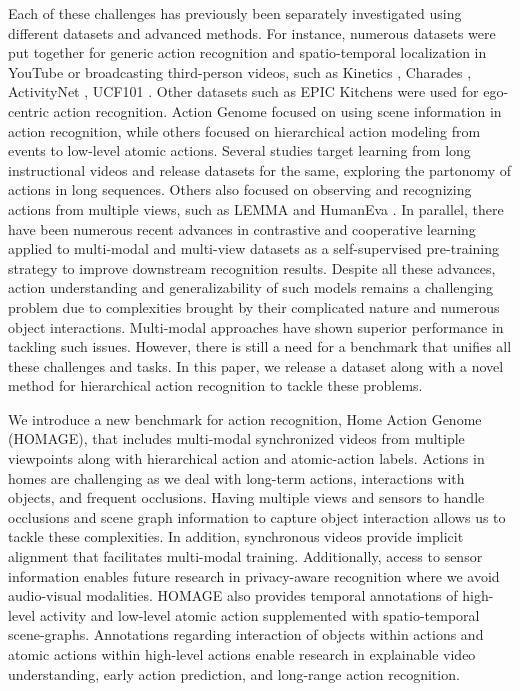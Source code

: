 \documentclass[final]{cvpr}
\begin{document}
Each of these challenges has previously been separately investigated using different datasets and advanced methods. For instance, numerous datasets were put together for generic action recognition and spatio-temporal localization in YouTube or broadcasting third-person videos, such as Kinetics \cite{kinetics700}, Charades \cite{charades}, ActivityNet \cite{activitynet}, UCF101 \cite{ucf101}. Other datasets such as EPIC Kitchens \cite{epic} were used for ego-centric action recognition. Action Genome \cite{action_genome} focused on using scene information in action recognition, while others \cite{malla2020titan} focused on hierarchical action modeling from events to low-level atomic actions. Several studies target learning from long instructional videos and release datasets \cite{chang2020procedure, miech2019howto100m, tang2019coin, ZhXuCoAAAI18} for the same, exploring the partonomy of actions in long sequences. Others also focused on observing and recognizing actions from multiple views, such as LEMMA \cite{jia2020lemma} and HumanEva \cite{humaneva}. In parallel, there have been numerous recent advances in contrastive and cooperative learning \cite{simclr, han2020self} applied to multi-modal and multi-view datasets as a self-supervised pre-training strategy to improve downstream recognition results. Despite all these advances, action understanding and generalizability of such models remains a challenging problem due to complexities brought by their complicated nature and numerous object interactions. Multi-modal approaches \cite{simonyanTwoStream14, crossLearn, cmc} have shown superior performance in tackling such issues. However, there is still a need for a benchmark that unifies all these challenges and tasks. In this paper, we release a dataset along with a novel method for hierarchical action recognition to tackle these problems.

We introduce a new benchmark for action recognition, Home Action Genome (HOMAGE), that includes multi-modal synchronized videos from multiple viewpoints along with hierarchical action and atomic-action labels. Actions in homes are challenging as we deal with long-term actions, interactions with objects, and frequent occlusions. Having multiple views and sensors to handle occlusions and scene graph information to capture object interaction allows us to tackle these complexities. In addition, synchronous videos provide implicit alignment that facilitates multi-modal training. Additionally, access to sensor information enables future research in privacy-aware recognition where we avoid audio-visual modalities. HOMAGE also provides temporal annotations of high-level activity and low-level atomic action supplemented with spatio-temporal scene-graphs. Annotations regarding interaction of objects within actions and atomic actions within high-level actions enable research in explainable video understanding, early action prediction, and long-range action recognition.
\end{document}
